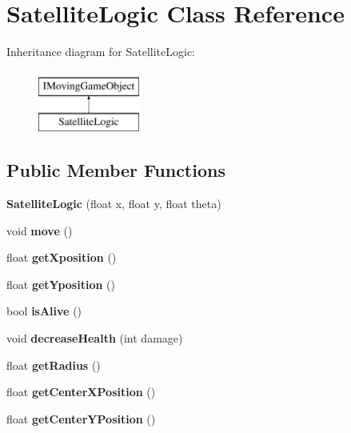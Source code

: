 \hypertarget{class_satellite_logic}{}\section{Satellite\+Logic Class Reference}
\label{class_satellite_logic}
Inheritance diagram for Satellite\+Logic\+:\begin{figure}[H]
\begin{center}
\leavevmode
\includegraphics[height=2.000000cm]{class_satellite_logic}
\end{center}
\end{figure}
\subsection*{Public Member Functions}
\begin{DoxyCompactItemize}
\item 
\mbox{\label{class_satellite_logic_af35f51991748099bc492ed7ba82b3b75}} 
{\bfseries Satellite\+Logic} (float x, float y, float theta)
\item 
\mbox{\label{class_satellite_logic_a1ad746e5a17b9ac2bea379fca9a74147}} 
void {\bfseries move} ()
\item 
\mbox{\label{class_satellite_logic_a3a35c4c5b5ff051dbfcffc7ce85e40a2}} 
float {\bfseries get\+Xposition} ()
\item 
\mbox{\label{class_satellite_logic_a1b0cb67d5bdb3cb120ec12b2be65755c}} 
float {\bfseries get\+Yposition} ()
\item 
\mbox{\label{class_satellite_logic_aa8f39f77a7783f8a97698ea750b34e94}} 
bool {\bfseries is\+Alive} ()
\item 
\mbox{\label{class_satellite_logic_ab026cc80cbd0f9f1b6e4970f121c6b7f}} 
void {\bfseries decrease\+Health} (int damage)
\item 
\mbox{\label{class_satellite_logic_a5b86efe041f1d537ec83b9f7dd574b7e}} 
float {\bfseries get\+Radius} ()
\item 
\mbox{\label{class_satellite_logic_aa6e4c41fc34adaf4ef7861a6a3785226}} 
float {\bfseries get\+Center\+X\+Position} ()
\item 
\mbox{\label{class_satellite_logic_a416fb2cabc7fcc003cbe04da68dac7c3}} 
float {\bfseries get\+Center\+Y\+Position} ()
\end{DoxyCompactItemize}


